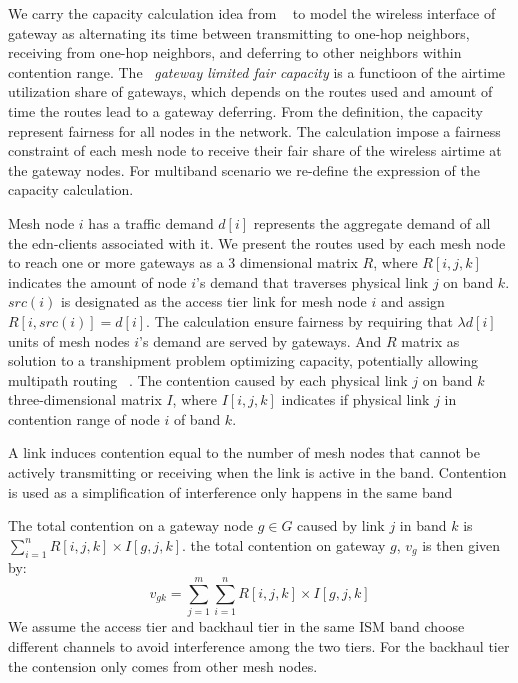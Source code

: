 We carry the capacity calculation idea from ~\cite{robinson2008adding} to model the wireless interface of gateway as alternating its time between transmitting to one-hop neighbors, receiving from one-hop neighbors, and deferring to other neighbors within contention range. 
The ~\emph{gateway limited fair capacity} is a functioon of the airtime utilization share of gateways, which depends on the routes used and amount of time the routes lead to a gateway deferring. From the definition, the capacity represent fairness for all nodes in the network. 
The calculation impose a fairness constraint of each mesh node to receive their fair share of the wireless airtime at the gateway nodes. 
For multiband scenario we re-define the expression of the capacity calculation.

Mesh node $i$ has a traffic demand $d[i]$ represents the aggregate demand of all the edn-clients associated with it. 
We present the routes used by each mesh node to reach one or more gateways as a 3 dimensional matrix $R$, where $R[i,j,k]$ indicates the amount of node $i$'s demand that traverses physical link $j$ on band $k$. 
$src(i)$ is designated as the access tier link for mesh node $i$ and assign $R[i,src(i)]=d[i]$. The calculation ensure fairness by requiring that $\lambda d[i]$ units of mesh nodes $ i$'s demand are served by gateways.
And $R$ matrix as solution to a transhipment problem optimizing capacity, potentially allowing multipath routing ~\cite{robinson2008adding}.
The contention caused by each physical link $j$ on band $k$ three-dimensional matrix $I$, where $I[i,j,k]$ indicates if physical link $j$  in contention range of node $i$ of band $k$.

A link induces contention equal to the number of mesh nodes that cannot be actively transmitting or receiving when the link is active in the band.
Contention is used as a simplification of interference only happens in the same band 

The total contention on a gateway node $g\in G$ caused by link $j$ in band $k$ is $\sum_{i=1}^nR[i,j,k] \times I[g,j,k]$. the total contention on gateway $g$, $v_g$ is then given by:
\begin{equation}
\label{eq:contention}
v_{gk}=\sum_{j=1}^m \sum_{i=1}^n R[i,j,k]\times I[g,j,k]
\end{equation}
We assume the access tier and backhaul tier in the same ISM band choose different channels to avoid interference among the two tiers. For the backhaul tier the contension only comes from other mesh nodes.

